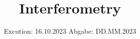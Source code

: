 

\subject{V64}
\title{Interferometry}
\date{%
  Excution: 16.10.2023
  \hspace{3em}
  Abgabe: DD.MM.2023
}



\maketitle
\setcounter{page}{1}







\printbibliography{}



